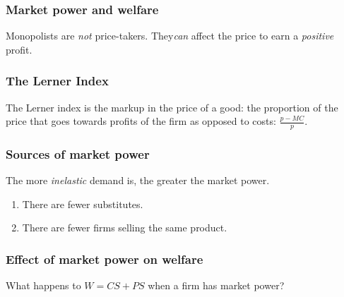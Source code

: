 \documentclass[xcolor=pdftex,dvipsnames]{beamer}
\begin{document}
\begin{frame}
  \frametitle{Market power and welfare}
  Monopolists are \emph{not} price-takers. They\emph{can} affect the
  price to earn a \emph{positive} profit.
\bigskip

\bigskip

\bigskip

\bigskip

\bigskip

\end{frame}

\begin{frame}
  \frametitle{The Lerner Index}
  The Lerner index is the markup in the price of a good: the
  proportion of the price that goes towards profits of the firm as
  opposed to costs: $\frac{p-MC}{p}$.




\end{frame}


\begin{frame}
  \frametitle{Sources of market power}
  The more \emph{inelastic} demand is, the greater the market power.

  \begin{enumerate}
  \item<3-> There are fewer substitutes.
  \item<4-> There are fewer firms selling the same product.
  \end{enumerate}

\end{frame}

\begin{frame}
  \frametitle{Effect of market power on welfare}
  What happens to $W=CS+PS$ when a firm has market power?
\bigskip


\bigskip

\end{frame}
\end{document}
